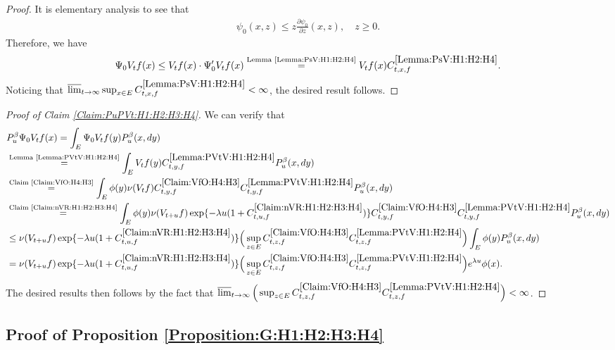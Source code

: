 \documentclass[12pt,a4paper]{amsart}
\numberwithin{equation}{section}
\theoremstyle{plain}
\theoremstyle{definition}
\theoremstyle{remark}
\newcounter{N}
\newcounter{n}[N]
\begin{document}
\begin{proof}  
It is elementary analysis to see that 
\begin{align}
 \psi_0(x,z) 
 \leq z \frac{\partial \psi_0}{\partial z} (x,z),
 \quad z\geq 0.
 \end{align}
Therefore, we have
\begin{align}
 \Psi_0 V_t f (x) 
 \leq V_tf(x)\cdot \Psi_0' V_t f(x) 
 \overset{\text{Lemma \ref{Lemma:PsV:H1:H2:H4}}}= V_tf(x) C^{\ref{Lemma:PsV:H1:H2:H4}}_{t,x,f}.
 \end{align}
 Noticing that $\varlimsup_{t\to \infty} \sup_{x\in E} C^{\ref{Lemma:PsV:H1:H2:H4}}_{t,x,f} <\infty$, the desired result follows.
\end{proof}
\begin{proof}[Proof of Claim \ref{Claim:PuPVt:H1:H2:H3:H4}]
We can verify that
\begin{align}
 &P_u^\beta \Psi_0 V_{t} f(x) 
 = \int_{E} \Psi_0V_tf(y) P_u^\beta (x,dy)
 \\&\overset{\text{Lemma \ref{Lemma:PVtV:H1:H2:H4}}}=\int_{E} V_tf(y)C^{\ref{Lemma:PVtV:H1:H2:H4}}_{t,y,f} P_u^\beta (x,dy)
  \\&\overset{\text{Claim \ref{Claim:VfO:H4:H3}}}=\int_{E} \phi(y)\nu(V_tf)C^{\ref{Claim:VfO:H4:H3}}_{t,y,f}C^{\ref{Lemma:PVtV:H1:H2:H4}}_{t,y,f} P_u^\beta (x,dy)
    \\&\overset{\text{Claim \ref{Claim:nVR:H1:H2:H3:H4}}}=\int_{E} \phi(y)\nu(V_{t+u}f) \exp\{-\lambda u (1+C^{\ref{Claim:nVR:H1:H2:H3:H4}}_{t,u,f}) \} C^{\ref{Claim:VfO:H4:H3}}_{t,y,f}C^{\ref{Lemma:PVtV:H1:H2:H4}}_{t,y,f} P_u^\beta (x,dy)
    \\& \leq \nu(V_{t+u}f) \exp\{-\lambda u (1+C^{\ref{Claim:nVR:H1:H2:H3:H4}}_{t,u,f}) \} \Big(\sup_{z\in E} C^{\ref{Claim:VfO:H4:H3}}_{t,z,f}C^{\ref{Lemma:PVtV:H1:H2:H4}}_{t,z,f}\Big) \int_{E} \phi(y) P_u^\beta (x,dy)
    \\& = \nu(V_{t+u}f) \exp\{-\lambda u (1+C^{\ref{Claim:nVR:H1:H2:H3:H4}}_{t,u,f}) \} \Big(\sup_{z\in E} C^{\ref{Claim:VfO:H4:H3}}_{t,z,f}C^{\ref{Lemma:PVtV:H1:H2:H4}}_{t,z,f}\Big) e^{\lambda u}\phi(x).
 \end{align}
 The desired results then follows by the fact that $\varlimsup_{t\to \infty} \Big(\sup_{z\in E} C^{\ref{Claim:VfO:H4:H3}}_{t,z,f}C^{\ref{Lemma:PVtV:H1:H2:H4}}_{t,z,f}\Big) < \infty$.
\end{proof}
\subsection{Proof of Proposition \ref{Proposition:G:H1:H2:H3:H4}}\label{sec:G}
\end{document}
